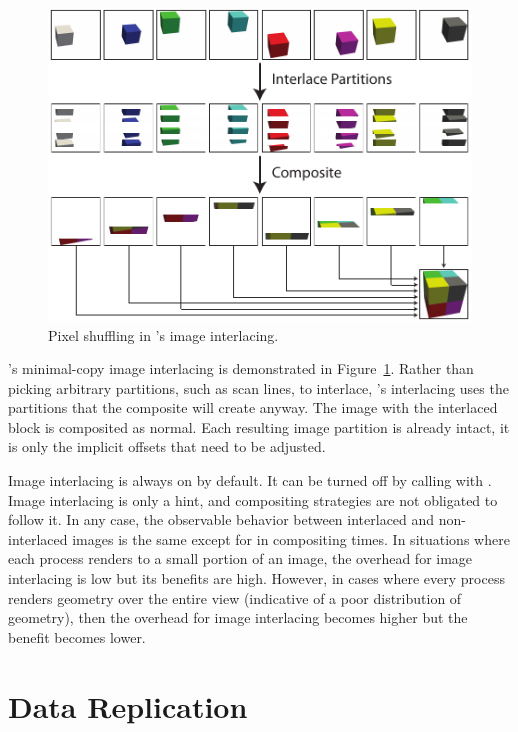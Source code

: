 \begin{figure}
  \centering
  \includegraphics[width=.8\textwidth]{images/InterlaceDiagram}
  \caption{Pixel shuffling in \IceT's image interlacing.}
  \label{fig:Interlacing}
\end{figure}

\IceT's minimal-copy image interlacing is demonstrated in
Figure~\ref{fig:Interlacing}.  Rather than picking arbitrary partitions,
such as scan lines, to interlace, \IceT's interlacing uses the partitions
that the composite will create anyway.  The image with the interlaced block
is composited as normal.  Each resulting image partition is already intact,
it is only the implicit offsets that need to be adjusted.

Image interlacing is always on by default.  It can be turned off by calling
 with .  Image
interlacing is only a hint, and compositing strategies are not obligated to
follow it.  In any case, the observable behavior between interlaced and
non-interlaced images is the same except for in compositing times.  In
situations where each process renders to a small portion of an image, the
overhead for image interlacing is low but its benefits are high.  However,
in cases where every process renders geometry over the entire view
(indicative of a poor distribution of geometry), then the overhead for
image interlacing becomes higher but the benefit becomes lower.


\section{Data Replication}
\label{sec:Customizing_Compositing:Data_Replication}

